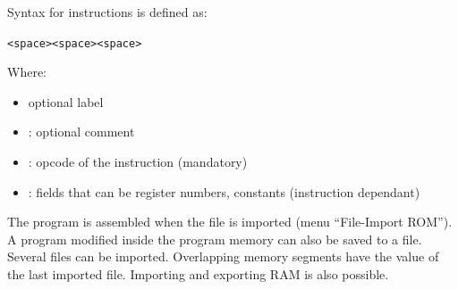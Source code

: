 \documentclass[10pt,a4paper]{article}
\theoremstyle{definition}%
\begin{document}
\newpage
Syntax for instructions is defined as:
\begin{center}
\texttt{{\color{blue}{label:}}<space>{\color{red}{opcode}}<space>{}<space>{\color{blue}{// comments}}}
\end{center}
Where:
\begin{itemize}
	\item  {\color{blue}{label:}} optional label
	\item  {\color{blue}{// comments}}: optional comment
	\item {\color{red}{opcode}}:  opcode of the instruction (mandatory)
	\item {}:	fields that can be register numbers, constants (instruction dependant)
\end{itemize}

The program is assembled when the file is imported (menu ``File-Import ROM''). A program modified inside the program memory can also be saved to a file. Several files can be imported. Overlapping memory segments have the value of the last imported file. Importing and exporting RAM is also possible.
 
%
%
%
\end{document}
